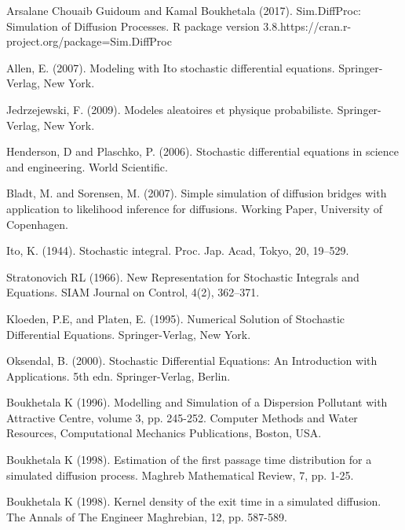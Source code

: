 
\begin{thebibliography}{00}

Arsalane Chouaib Guidoum and Kamal Boukhetala (2017). 
\newblock Sim.DiffProc: Simulation of Diffusion Processes.
\newblock R package version 3.8.https://cran.r-project.org/package=Sim.DiffProc

Allen, E. (2007). 
\newblock Modeling with Ito stochastic differential equations.
\newblock Springer-Verlag, New York.

Jedrzejewski, F. (2009). 
\newblock Modeles aleatoires et physique probabiliste. 
\newblock Springer-Verlag, New York.

Henderson, D and Plaschko, P. (2006). 
\newblock Stochastic differential equations in science and engineering. 
\newblock World Scientific.

Bladt, M. and Sorensen, M. (2007). 
\newblock Simple simulation of diffusion bridges with application to likelihood inference for diffusions. 
Working Paper, University of Copenhagen.

Ito, K. (1944). 
\newblock Stochastic integral. 
\newblock Proc. Jap. Acad, Tokyo, 20, 19–529.

Stratonovich RL (1966). 
\newblock New Representation for Stochastic Integrals and Equations. 
\newblock SIAM Journal on Control, 4(2), 362–371.

Kloeden, P.E, and Platen, E. (1995). 
\newblock Numerical Solution of Stochastic Differential Equations. 
\newblock Springer-Verlag, New York.

Oksendal, B. (2000). 
\newblock Stochastic Differential Equations: An Introduction with Applications. 
\newblock 5th edn. Springer-Verlag, Berlin.

Boukhetala K (1996). 
\newblock Modelling and Simulation of a Dispersion Pollutant with Attractive Centre, volume 3, pp. 245-252. 
\newblock Computer Methods and Water Resources, Computational Mechanics Publications, Boston, USA.

Boukhetala K (1998). 
\newblock Estimation of the first passage time distribution for a simulated diffusion process. 
\newblock Maghreb Mathematical Review, 7, pp. 1-25.

Boukhetala K (1998). 
\newblock Kernel density of the exit time in a simulated diffusion. 
\newblock The Annals of The Engineer Maghrebian, 12, pp. 587-589.


\end{thebibliography}
